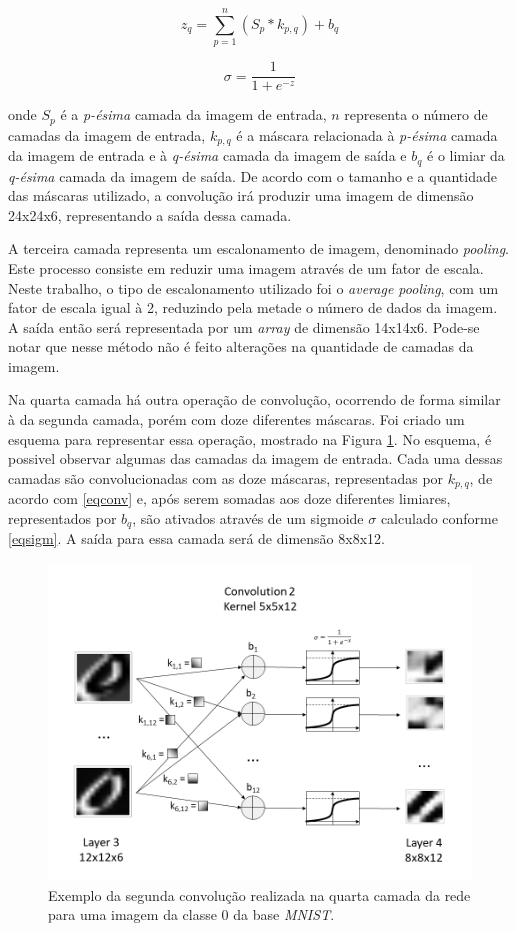 \documentclass[conference]{IEEEtran}
\begin{document}
\begin{equation}
z_{q} = \sum_{p=1}^{n} \left ( S_{p} \ast k_{p,q} \right ) + b_{q} \label{eqconv}
\end{equation}

\begin{equation}
\sigma = \frac {1} { 1 + e^{-z} } \label{eqsigm}
\end{equation}

onde $S_{p}$ é a \textit{p-ésima} camada da imagem de entrada, $n$ representa o número de camadas da imagem de entrada, $k_{p,q}$ é a máscara relacionada à \textit{p-ésima} camada da imagem de entrada e à \textit{q-ésima} camada da imagem de saída e $b_{q}$ é o limiar da \textit{q-ésima} camada da imagem de saída. De acordo com o tamanho e a quantidade das máscaras utilizado, a convolução irá produzir uma imagem de dimensão 24x24x6, representando a saída dessa camada.
 
A terceira camada representa um escalonamento de imagem, denominado \textit{pooling}. Este processo consiste em reduzir uma imagem através de um fator de escala. Neste trabalho, o tipo de escalonamento utilizado foi o \textit{average pooling}, com um fator de escala igual à 2, reduzindo pela metade o número de dados da imagem. A saída então será representada por um \textit{array} de dimensão 14x14x6. Pode-se notar que nesse método não é feito alterações na quantidade de camadas da imagem.

Na quarta camada há outra operação de convolução, ocorrendo de forma similar à da segunda camada, porém com doze diferentes máscaras. Foi criado um esquema para representar essa operação, mostrado na Figura \ref{figconv}. No esquema, é possivel observar algumas das camadas da imagem de entrada. Cada uma dessas camadas são convolucionadas com as doze máscaras, representadas por $k_{p,q}$, de acordo com \eqref{eqconv} e, após serem somadas aos doze diferentes limiares, representados por $b_{q}$, são ativados através de um sigmoide $\sigma$ calculado conforme \eqref{eqsigm}. A saída para essa camada será de dimensão 8x8x12.

\begin{figure}[b]
\centerline{\includegraphics[width=.8\columnwidth]{fig/conv.png}}
\caption{Exemplo da segunda convolução realizada na quarta camada da rede para uma imagem da classe $0$ da base \textit{MNIST}.}
\label{figconv}
\end{figure}
\end{document}
